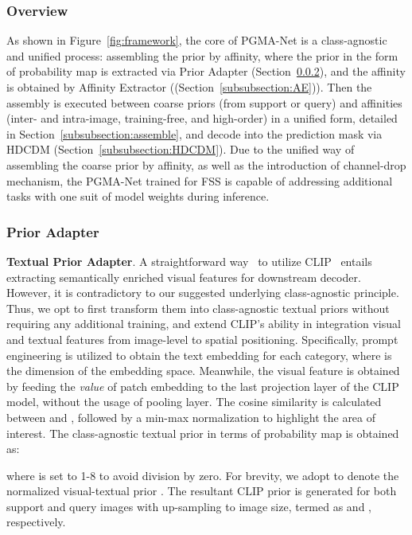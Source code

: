 \documentclass[lettersize,journal]{IEEEtran}
\begin{document}
\subsubsection{Overview}
\label{subsubsection:Overview}

As shown in Figure~\ref{fig:framework}, the core of PGMA-Net is a class-agnostic and unified process: assembling the prior by affinity, where the prior in the form of probability map is extracted via Prior Adapter (Section~\ref{subsubsection:PA}), and the affinity is obtained by Affinity Extractor ((Section~\ref{subsubsection:AE})). Then the assembly is executed between coarse priors (from support or query) and affinities (inter- and intra-image, training-free, and high-order) in a unified form, detailed in Section~\ref{subsubsection:assemble}, and decode into the prediction mask via HDCDM (Section~\ref{subsubsection:HDCDM}). Due to the unified way of assembling the coarse prior by affinity, as well as the introduction of channel-drop mechanism, the PGMA-Net trained for FSS is capable of addressing additional tasks with one suit of model weights during inference.



\subsubsection{Prior Adapter}
\label{subsubsection:PA}

\textbf{}\textbf{Textual Prior Adapter}. A straightforward way~\cite{luddecke2022image} to utilize CLIP~\cite{radford2021learning} entails extracting semantically enriched visual features for downstream decoder. However, it is contradictory to our suggested underlying class-agnostic principle. Thus, we opt to first transform them into class-agnostic textual priors without requiring any additional training, and extend CLIP's ability in integration visual and textual features from image-level to spatial positioning. Specifically, prompt engineering is utilized to obtain the text embedding  for each category, where  is the dimension of the embedding space. Meanwhile, the visual feature  is obtained by feeding the \textit{value} of patch embedding to the last projection layer of the CLIP model, without the usage of pooling layer. The cosine similarity is calculated between  and , followed by a min-max normalization to highlight the area of interest. The class-agnostic textual prior in terms of probability map is obtained as:


where  is set to 1-8 to avoid division by zero. For brevity, we adopt  to denote the normalized visual-textual prior . The resultant CLIP prior is generated for both support and query images with up-sampling to image size, termed as  and , respectively.
\end{document}

